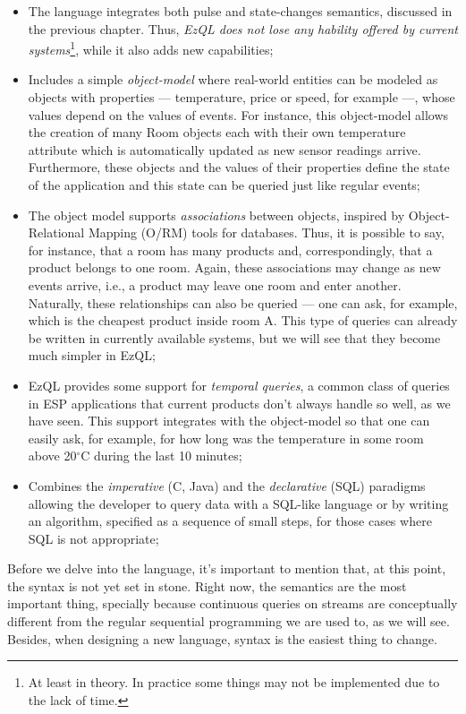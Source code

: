 \documentclass{report}
\begin{document}
\begin{itemize}
\item The language integrates both pulse and state-changes semantics,
  discussed in the previous chapter. Thus, \emph{EzQL does not lose
    any hability offered by current systems}\footnote{At least in
    theory. In practice some things may not be implemented due to the
    lack of time.}, while it also adds new capabilities;
\item Includes a simple \emph{object-model} where real-world entities
  can be modeled as objects with properties --- temperature, price or
  speed, for example ---, whose values depend on the values of
  events. For instance, this object-model allows the creation of many
  Room objects each with their own temperature attribute which is
  automatically updated as new sensor readings arrive. Furthermore,
  these objects and the values of their properties define the state of
  the application and this state can be queried just like regular
  events;
\item The object model supports \emph{associations} between objects,
  inspired by Ob\-ject-Relational Mapping (O/RM) tools for
  databases. Thus, it is possible to say, for instance, that a room
  has many products and, correspondingly, that a product belongs to
  one room. Again, these associations may change as new events arrive,
  i.e., a product may leave one room and enter another. Naturally,
  these relationships can also be queried --- one can ask, for
  example, which is the cheapest product inside room A. This type of
  queries can already be written in currently available systems, but
  we will see that they become much simpler in EzQL;
\item EzQL provides some support for \emph{temporal queries}, a common
  class of queries in ESP applications that current products don't
  always handle so well, as we have seen. This support integrates with
  the object-model so that one can easily ask, for example, for how
  long was the temperature in some room above 20$^{\circ}$C during the
  last 10 minutes;
\item Combines the \emph{imperative} (C, Java) and the
  \emph{declarative} (SQL) paradigms allowing the developer to query
  data with a SQL-like language or by writing an algorithm, specified
  as a sequence of small steps, for those cases where SQL is not
  appropriate;
\end{itemize}

Before we delve into the language, it's important to mention that, at
this point, the syntax is not yet set in stone. Right now, the
semantics are the most important thing, specially because continuous
queries on streams are conceptually different from the regular
sequential programming we are used to, as we will see. Besides, when
designing a new language, syntax is the easiest thing to change.
\end{document}
